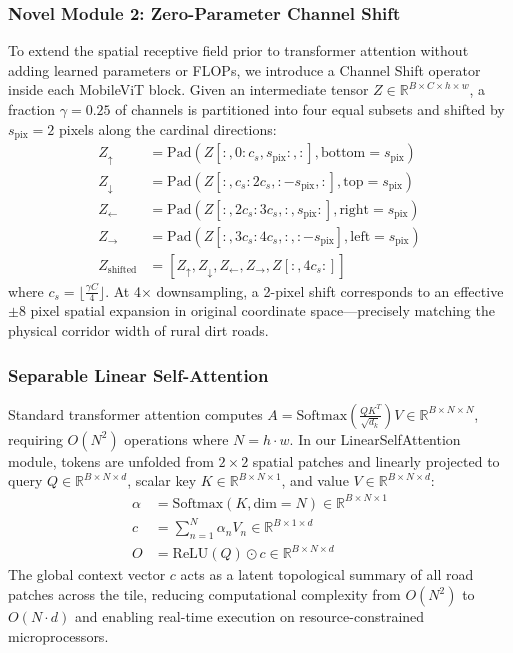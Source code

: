 \documentclass[conference]{IEEEtran}
\begin{document}
\subsubsection{Novel Module 2: Zero-Parameter Channel Shift}
To extend the spatial receptive field prior to transformer attention without adding learned parameters or FLOPs, we introduce a Channel Shift operator inside each MobileViT block. Given an intermediate tensor $Z \in \mathbb{R}^{B \times C \times h \times w}$, a fraction $\gamma = 0.25$ of channels is partitioned into four equal subsets and shifted by $s_{\text{pix}} = 2$ pixels along the cardinal directions:
\begin{align}
    Z_{\uparrow} &= \text{Pad}\left(Z[:, 0:c_s, s_{\text{pix}}:, :], \text{bottom}=s_{\text{pix}}\right) \\
    Z_{\downarrow} &= \text{Pad}\left(Z[:, c_s:2c_s, :-s_{\text{pix}}, :], \text{top}=s_{\text{pix}}\right) \\
    Z_{\leftarrow} &= \text{Pad}\left(Z[:, 2c_s:3c_s, :, s_{\text{pix}}:], \text{right}=s_{\text{pix}}\right) \\
    Z_{\rightarrow} &= \text{Pad}\left(Z[:, 3c_s:4c_s, :, :-s_{\text{pix}}], \text{left}=s_{\text{pix}}\right) \\
    Z_{\text{shifted}} &= \left[ Z_{\uparrow}, Z_{\downarrow}, Z_{\leftarrow}, Z_{\rightarrow}, Z[:, 4c_s:] \right]
\end{align}
where $c_s = \lfloor \frac{\gamma C}{4} \rfloor$. At 4$\times$ downsampling, a 2-pixel shift corresponds to an effective $\pm8$ pixel spatial expansion in original coordinate space—precisely matching the physical corridor width of rural dirt roads.

\subsubsection{Separable Linear Self-Attention}
Standard transformer attention computes $A = \text{Softmax}\left(\frac{QK^T}{\sqrt{d_k}}\right)V \in \mathbb{R}^{B \times N \times N}$, requiring $O(N^2)$ operations where $N = h \cdot w$. In our LinearSelfAttention module, tokens are unfolded from $2\times2$ spatial patches and linearly projected to query $Q \in \mathbb{R}^{B \times N \times d}$, scalar key $K \in \mathbb{R}^{B \times N \times 1}$, and value $V \in \mathbb{R}^{B \times N \times d}$:
\begin{align}
    \alpha &= \text{Softmax}(K, \text{dim}=N) \in \mathbb{R}^{B \times N \times 1} \\
    c &= \sum_{n=1}^N \alpha_n V_n \in \mathbb{R}^{B \times 1 \times d} \\
    O &= \text{ReLU}(Q) \odot c \in \mathbb{R}^{B \times N \times d}
\end{align}
The global context vector $c$ acts as a latent topological summary of all road patches across the tile, reducing computational complexity from $O(N^2)$ to $O(N \cdot d)$ and enabling real-time execution on resource-constrained microprocessors.
\end{document}
